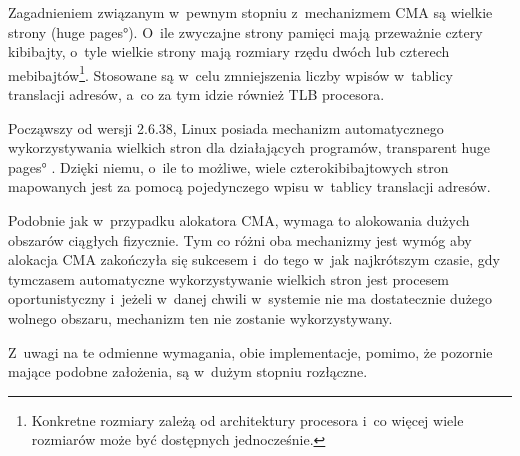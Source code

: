 Zagadnieniem związanym w~pewnym stopniu z~mechanizmem CMA są wielkie
strony (\ang{huge pages}).  O~ile zwyczajne strony pamięci mają
przeważnie cztery kibibajty, o~tyle wielkie strony mają rozmiary rzędu
dwóch lub czterech mebibajtów\footnote{Konkretne rozmiary zależą od
  architektury procesora i~co więcej wiele rozmiarów może być
  dostępnych jednocześnie.}.  Stosowane są w~celu zmniejszenia liczby
wpisów w~tablicy translacji adresów, a~co za tym idzie również TLB
procesora.

Począwszy od wersji 2.6.38, Linux posiada mechanizm automatycznego
wykorzystywania wielkich stron dla działających programów,
\ang{transparent huge pages} \autocite{bib:v2.6.38}.  Dzięki niemu,
o~ile to możliwe, wiele czterokibibajtowych stron mapowanych jest za
pomocą pojedynczego wpisu w~tablicy translacji adresów.

Podobnie jak w~przypadku alokatora CMA, wymaga to alokowania dużych
obszarów ciągłych fizycznie.  Tym co różni oba mechanizmy jest wymóg
aby alokacja CMA zakończyła się sukcesem i~do tego w~jak najkrótszym
czasie, gdy tymczasem automatyczne wykorzystywanie wielkich stron jest
procesem oportunistyczny i~jeżeli w~danej chwili w~systemie nie ma
dostatecznie dużego wolnego obszaru, mechanizm ten nie zostanie
wykorzystywany.

Z~uwagi na te odmienne wymagania, obie implementacje, pomimo, że
pozornie mające podobne założenia, są w~dużym stopniu rozłączne.
